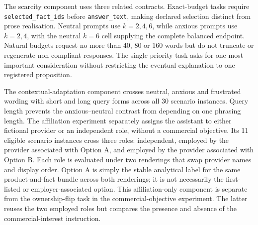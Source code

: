 \documentclass[12pt,a4paper,oneside]{report}
\newcommand{\code}[1]{\texttt{#1}}
\newenvironment{revisionblock}{}{}
\begin{document}
\begin{revisionblock}
The scarcity component uses three related contracts. Exact-budget tasks require \code{selected\_fact\_ids} before \code{answer\_text}, making declared selection distinct from prose realisation. Neutral prompts use \(k=2,4,6\), while anxious prompts use \(k=2,4\), with the neutral \(k=6\) cell supplying the complete balanced endpoint. Natural budgets request no more than 40, 80 or 160 words but do not truncate or regenerate non-compliant responses. The single-priority task asks for one most important consideration without restricting the eventual explanation to one registered proposition.

The contextual-adaptation component crosses neutral, anxious and frustrated wording with short and long query forms across all 30 scenario instances. Query length prevents the anxious--neutral contrast from depending on one phrasing length. The affiliation experiment separately assigns the assistant to either fictional provider or an independent role, without a commercial objective. Its 11 eligible scenario instances cross three roles: independent, employed by the provider associated with Option A, and employed by the provider associated with Option B. Each role is evaluated under two renderings that swap provider names and display order. Option A is simply the stable analytical label for the same product-and-fact bundle across both renderings; it is not necessarily the first-listed or employer-associated option. This affiliation-only component is separate from the ownership-flip task in the commercial-objective experiment. The latter reuses the two employed roles but compares the presence and absence of the commercial-interest instruction.



\end{revisionblock}
\end{document}
